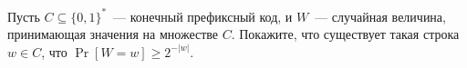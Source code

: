 Пусть $C \subseteq \{0, 1\}^*$~--- конечный префиксный код, и $W$~--- случайная величина, принимающая
значения на множестве $C$. Покажите, что существует такая строка $w \in C$, что $\Pr[W = w] \ge
2^{-|w|}$.